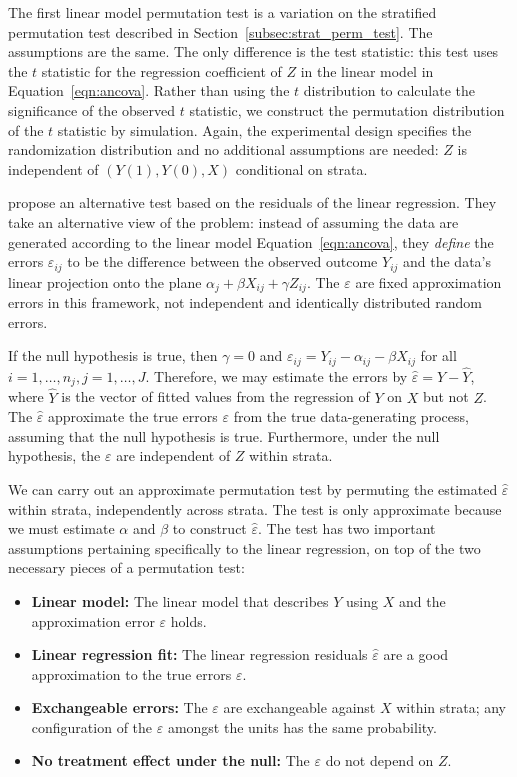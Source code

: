 \documentclass[12pt]{article}
\begin{document}
The first linear model permutation test is a variation on the stratified permutation test described in Section~\ref{subsec:strat_perm_test}.
The assumptions are the same.
The only difference is the test statistic:
this test uses the $t$ statistic for the regression coefficient of $Z$ in the linear model in Equation~\ref{eqn:ancova}.
Rather than using the $t$ distribution to calculate the significance of the observed $t$ statistic, we construct the permutation distribution of the $t$ statistic by simulation.
Again, the experimental design specifies the randomization distribution and no additional assumptions are needed:
$Z$ is independent of $(Y(1), Y(0), X)$ conditional on strata.

\citet{freedman_nonstochastic_1983} propose an alternative test based on the residuals of the linear regression.
They take an alternative view of the problem:
instead of assuming the data are generated according to the linear model Equation~\ref{eqn:ancova}, they \textit{define} the errors $\varepsilon_{ij}$ to be the difference between the observed outcome $Y_{ij}$ and the data's linear projection onto the plane $\alpha_j + \beta X_{ij}+ \gamma Z_{ij}$.
The $\varepsilon$ are fixed approximation errors in this framework, not independent and identically distributed random errors.

If the null hypothesis is true, then $\gamma = 0$ and $\varepsilon_{ij} = Y_{ij} - \alpha_{ij} - \beta X_{ij}$ for all $i = 1, \dots, n_j, j = 1, \dots, J$.
Therefore, we may estimate the errors by $\hat{\varepsilon} =Y - \hat{Y}$, where $\hat{Y}$ is the vector of fitted values from the regression of $Y$ on $X$ but not $Z$.
The $\hat{\varepsilon}$ approximate the true errors $\varepsilon$ from the true data-generating process, assuming that the null hypothesis is true.
Furthermore, under the null hypothesis, the $\varepsilon$ are independent of $Z$ within strata. 

We can carry out an approximate permutation test by permuting the estimated $\hat{\varepsilon}$ within strata, independently across strata.
The test is only approximate because we must estimate $\alpha$ and $\beta$ to construct $\hat{\varepsilon}$.
The test has two important assumptions pertaining specifically to the linear regression, on top of the two necessary pieces of a permutation test:
\begin{itemize}
\item \textbf{Linear model:} The linear model that describes $Y$ using $X$ and the approximation error $\varepsilon$ holds.
\item \textbf{Linear regression fit:} The linear regression residuals $\hat{\varepsilon}$ are a good approximation to the true errors $\varepsilon$.
\item \textbf{Exchangeable errors:} The $\varepsilon$ are exchangeable against $X$ within strata; any configuration of the $\varepsilon$ amongst the units has the same probability.
\item \textbf{No treatment effect under the null:} The $\varepsilon$ do not depend on $Z$.
\end{itemize}
\end{document}
